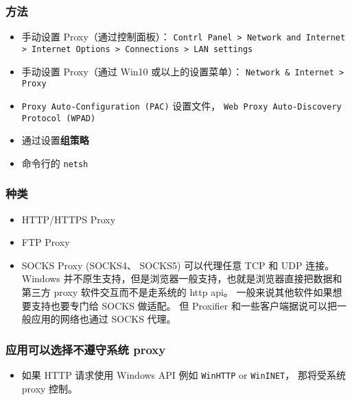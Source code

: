
\subsubsection{方法}
\begin{itemize}
\item 手动设置 Proxy（通过控制面板）： \verb`Contrl Panel > Network and Internet > Internet Options > Connections > LAN settings`
\item 手动设置 Proxy（通过 Win10 或以上的设置菜单）： \verb`Network & Internet > Proxy`
\item \verb`Proxy Auto-Configuration (PAC)` 设置文件， \verb`Web Proxy Auto-Discovery Protocol (WPAD)`
\item 通过设置\textbf{组策略}
\item 命令行的 \verb`netsh`
\end{itemize}

\subsubsection{种类}
\begin{itemize}
\item HTTP/HTTPS Proxy
\item FTP Proxy
\item SOCKS Proxy (SOCKS4、 SOCKS5) 可以代理任意 TCP 和 UDP 连接。Windows 并不原生支持，但是浏览器一般支持，也就是浏览器直接把数据和第三方 proxy 软件交互而不是走系统的 http api。 一般来说其他软件如果想要支持也要专门给 SOCKS 做适配。 但 Proxifier 和一些客户端据说可以把一般应用的网络也通过 SOCKS 代理。
\end{itemize}

\subsubsection{应用可以选择不遵守系统 proxy}
\begin{itemize}
\item 如果 HTTP 请求使用 Windows API 例如 \verb`WinHTTP` or \verb`WinINET`， 那将受系统 proxy 控制。
\end{itemize}
